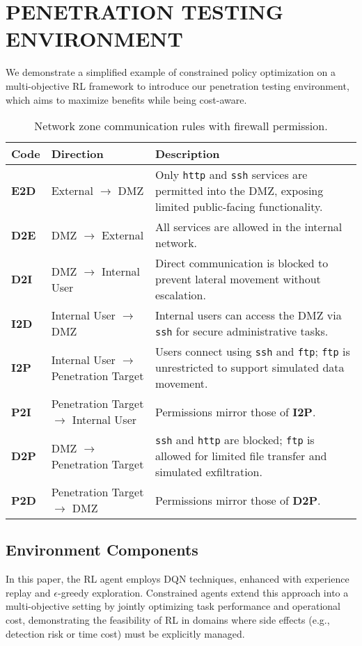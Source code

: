\section{\uppercase{Penetration Testing Environment}}
\label{sec:penEnv}


We demonstrate a simplified example of constrained policy optimization on a multi-objective RL framework to introduce our penetration testing environment, which aims to maximize benefits while being cost-aware.

\begin{table*}[t]
\centering
\caption{Network zone communication rules with firewall permission.}
\label{tab:network_policies}
\begin{tabular}{llp{8cm}}
\toprule
\textbf{Code} & \textbf{Direction} & \textbf{Description} \\
\midrule
\textbf{E2D} & External $\rightarrow$ DMZ & Only \texttt{http} and \texttt{ssh} services are permitted into the DMZ, exposing limited public-facing functionality. \\
\textbf{D2E} & DMZ $\rightarrow$ External & All services are allowed in the internal network. \\
\textbf{D2I} & DMZ $\rightarrow$ Internal User & Direct communication is blocked to prevent lateral movement without escalation. \\
\textbf{I2D} & Internal User $\rightarrow$ DMZ & Internal users can access the DMZ via \texttt{ssh} for secure administrative tasks. \\
\textbf{I2P} & Internal User $\rightarrow$ Penetration Target & Users connect using \texttt{ssh} and \texttt{ftp}; \texttt{ftp} is unrestricted to support simulated data movement. \\
\textbf{P2I} & Penetration Target $\rightarrow$ Internal User & Permissions mirror those of \textbf{I2P}. \\
\textbf{D2P} & DMZ $\rightarrow$ Penetration Target & \texttt{ssh} and \texttt{http} are blocked; \texttt{ftp} is allowed for limited file transfer and simulated exfiltration. \\
\textbf{P2D} & Penetration Target $\rightarrow$ DMZ & Permissions mirror those of \textbf{D2P}. \\
\bottomrule
\end{tabular}
\end{table*}

\subsection{Environment Components}
In this paper, the RL agent employs DQN techniques, enhanced with experience replay and $\epsilon$-greedy exploration. Constrained agents extend this approach into a multi-objective setting by jointly optimizing task performance and operational cost, demonstrating the feasibility of RL in domains where side effects (e.g., detection risk or time cost) must be explicitly managed. 

